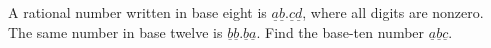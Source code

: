 A rational number written in base eight is $\underline{a} \underline{b} . \underline{c} \underline{d}$,  where all digits are nonzero. The same number in base twelve is $\underline{b} \underline{b} . \underline{b} \underline{a}$. Find the base-ten number $\underline{a} \underline{b} \underline{c}$.